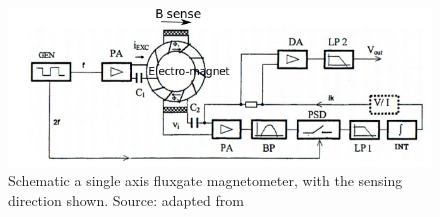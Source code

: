 \documentclass[crop=false,class=mitthesis,oneside,font=12pt]{standalone}
\begin{document}
\begin{figure}[H]
	\centering\includegraphics[width=30pc]{magnto.png}
	\caption{Schematic a single axis fluxgate magnetometer, with the sensing direction shown. Source: adapted from \cite{ripka2001magnetic}}
	\label{fig:magnemtr}
\end{figure}
\end{document}
